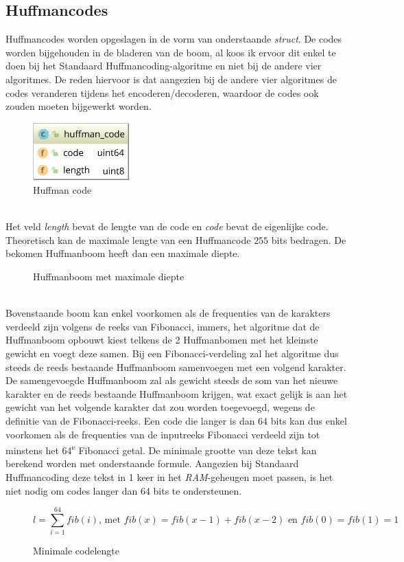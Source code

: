 \subsection{Huffmancodes}

Huffmancodes worden opgeslagen in de vorm van onderstaande \emph{struct}. De codes worden bijgehouden in de bladeren van de boom, al koos ik ervoor dit enkel te doen bij het Standaard Huffmancoding-algoritme en niet bij de andere vier algoritmes. De reden hiervoor is dat aangezien bij de andere vier algoritmes de codes veranderen tijdens het encoderen/decoderen, waardoor de codes ook zouden moeten bijgewerkt worden.
\begin{figure}[h]
	\centering
	\includegraphics[width=10em]{resources/huffman-code.png}
	\caption{Huffman code}
\end{figure}
\\Het veld \emph{length} bevat de lengte van de code en \emph{code} bevat de eigenlijke code. Theoretisch kan de maximale lengte van een Huffmancode $255$ bits bedragen. De bekomen Huffmanboom heeft dan een maximale diepte.
\begin{figure}[h]
	\centering
{}
\caption{Huffmanboom met maximale diepte}
\end{figure}
\\Bovenstaande boom kan enkel voorkomen als de frequenties van de karakters verdeeld zijn volgens de reeks van Fibonacci, immers, het algoritme dat de Huffmanboom opbouwt kiest telkens de 2 Huffmanbomen met het kleinste gewicht en voegt deze samen. Bij een Fibonacci-verdeling zal het algoritme dus steeds de reeds bestaande Huffmanboom samenvoegen met een volgend karakter. De samengevoegde Huffmanboom zal als gewicht steeds de som van het nieuwe karakter en de reeds bestaande Huffmanboom krijgen, wat exact gelijk is aan het gewicht van het volgende karakter dat zou worden toegevoegd, wegens de definitie van de Fibonacci-reeks. Een code die langer is dan 64 bits kan dus enkel voorkomen als de frequenties van de inputreeks Fibonacci verdeeld zijn tot minstens het 64\textsuperscript{e} Fibonacci getal. De minimale grootte van deze tekst kan berekend worden met onderstaande formule. Aangezien bij Standaard Huffmancoding deze tekst in 1 keer in het \emph{RAM}-geheugen moet passen, is het niet nodig om codes langer dan 64 bits te ondersteunen.
\begin{figure}[h]
	$$l = \sum_{i=1}^{64} fib(i)\text{, met }fib(x) = fib(x-1) + fib(x-2)\text{ en }fib(0) = fib(1) = 1$$
	\caption{Minimale codelengte}
\end{figure}